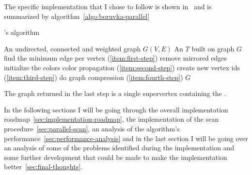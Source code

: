 \documentclass[a4paper,10pt]{article}
\begin{document}
The specific implementation that I chose to follow is shown in~\cite{generic-he-boruvka} and is summarized by algorithm~\ref{algo:boruvka-parallel}

\begin{algorithm}
	\caption{\brka's algorithm}
	\label{algo:boruvka-parallel}
	\begin{algorithmic}[1]
		\REQUIRE An undirected, connected and weighted graph $G(V, E)$
		\ENSURE An \mst$T$ built on graph $G$
			\STATE find the minimum edge per vertex (\ref{item:first-step})
			\STATE remove mirrored edges
			\STATE initialize the colors
				\STATE color propagation (\ref{item:second-step})
			\ENDWHILE
			\STATE create new vertex ids (\ref{item:third-step})
			\STATE do graph compression (\ref{item:fourth-step})
		\ENDWHILE
		\STATE\RETURN $G$
	\end{algorithmic}
\end{algorithm}

The graph returned in the last step is a single supervertex containing the \mst.

In the following sections I will be going through the overall implementation roadmap~\ref{sec:implementation-roadmap}, the implementation of the scan procedure~\ref{sec:parallel-scan}, an analysis of the algorithm's performance~\ref{sec:performance-analysis} and in the last section I will be going over an analysis of some of the problems identified during the implementation and some further development that could be made to make the implementation better~\ref{sec:final-thoughts}. 
\end{document}
